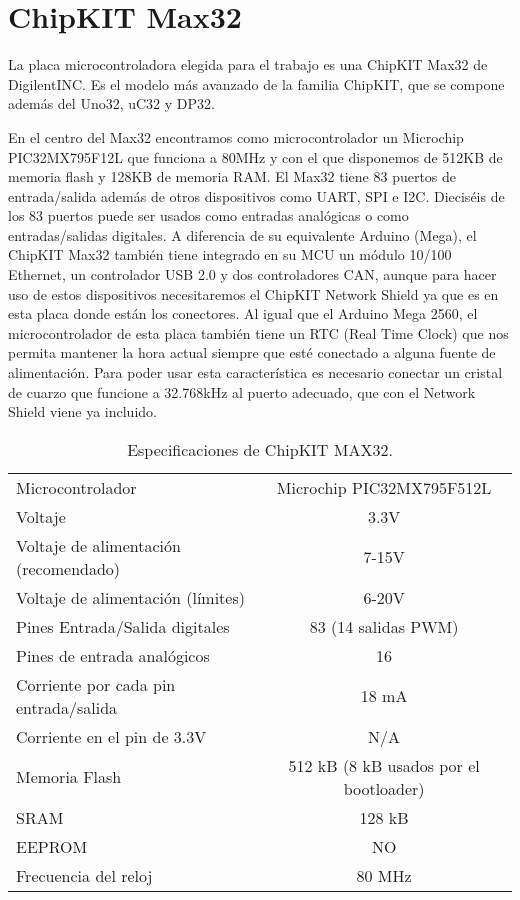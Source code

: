\section{ChipKIT Max32}
La placa microcontroladora elegida para el trabajo es una ChipKIT Max32 de DigilentINC. Es el modelo más avanzado de la familia ChipKIT, que se compone además del Uno32, uC32 y DP32.


En el centro del Max32 encontramos como microcontrolador un Microchip PIC32MX795F12L que funciona a 80MHz y con el que disponemos de 512KB de memoria flash y 128KB de memoria RAM. El Max32 tiene 83 puertos de entrada/salida además de otros dispositivos como UART, SPI e I2C. Dieciséis de los 83 puertos puede ser usados como entradas analógicas o como entradas/salidas digitales. A diferencia de su equivalente Arduino (Mega), el ChipKIT Max32 también tiene integrado en su MCU un módulo 10/100 Ethernet, un controlador USB 2.0 y dos controladores CAN, aunque para hacer uso de estos dispositivos necesitaremos el ChipKIT Network Shield ya que es en esta placa donde están los conectores. Al igual que el Arduino Mega 2560, el microcontrolador de esta placa también tiene un RTC (Real Time Clock) que nos permita mantener la hora actual siempre que esté conectado a alguna fuente de alimentación. Para poder usar esta característica es necesario conectar un cristal de cuarzo que funcione a 32.768kHz al puerto adecuado, que con el Network Shield viene ya incluido.

\begin{table}
\begin{center}
\begin{tabular}{| l | c |}
\hline
Microcontrolador 						& Microchip PIC32MX795F512L \\
Voltaje									& 3.3V \\
Voltaje de alimentación (recomendado) 	& 7-15V \\
Voltaje de alimentación (límites) 		& 6-20V \\
Pines Entrada/Salida digitales			& 83 (14 salidas PWM) \\
Pines de entrada analógicos				& 16 \\
Corriente por cada pin entrada/salida 	& 18 mA \\
Corriente en el pin de 3.3V				& N/A  \\
Memoria Flash 							& 512 kB (8 kB usados por el bootloader) \\
SRAM									& 128 kB \\
EEPROM									& NO \\
Frecuencia del reloj					& 80 MHz \\
\hline
\end{tabular}
\end{center}
\caption{Especificaciones de ChipKIT MAX32.}
\label{tab:max32_specs}
\end{table}

